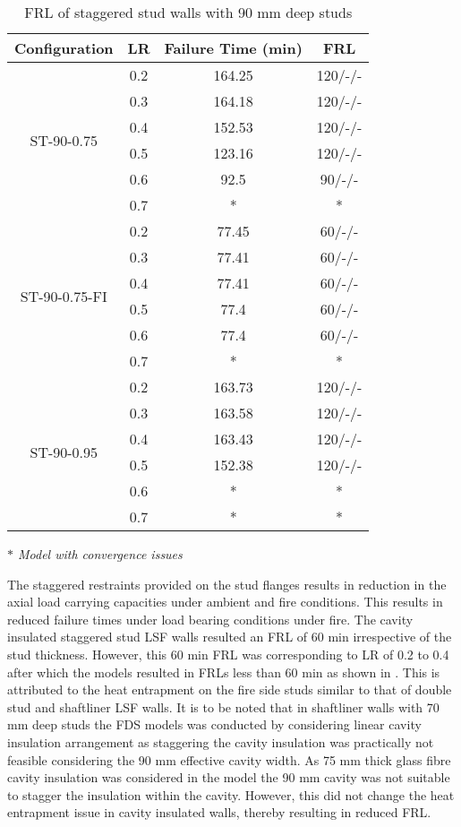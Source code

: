 \begin{table}[!htbp]
	\centering
	\caption{FRL of staggered stud walls with 90 mm deep studs}
	  \begin{tabular}{cccc}
	  \toprule
	  Configuration & LR    & Failure Time (min) & FRL \\
	  \midrule
	  \multirow{6}[2]{*}{ST-90-0.75} & 0.2   & 164.25 & 120/-/- \\
			& 0.3   & 164.18 & 120/-/- \\
			& 0.4   & 152.53 & 120/-/- \\
			& 0.5   & 123.16 & 120/-/- \\
			& 0.6   & 92.5  & 90/-/- \\
			& 0.7   & *     & * \\
	  \midrule
	  \multirow{6}[2]{*}{ST-90-0.75-FI} & 0.2   & 77.45 & 60/-/- \\
			& 0.3   & 77.41 & 60/-/- \\
			& 0.4   & 77.41 & 60/-/- \\
			& 0.5   & 77.4  & 60/-/- \\
			& 0.6   & 77.4  & 60/-/- \\
			& 0.7   & *     & * \\
	  \midrule
	  \multirow{6}[2]{*}{ST-90-0.95} & 0.2   & 163.73 & 120/-/- \\
			& 0.3   & 163.58 & 120/-/- \\
			& 0.4   & 163.43 & 120/-/- \\
			& 0.5   & 152.38 & 120/-/- \\
			& 0.6   & *     & * \\
			& 0.7   & *     & * \\
	  \bottomrule
	  \end{tabular}%
	\label{tab:frl-parametric-st-90}%

	\small \textit{$*$ Model with convergence issues}
\end{table}%

The staggered restraints provided on the stud flanges results in reduction in the axial load carrying capacities under ambient and fire conditions. This results in reduced failure times under load bearing conditions under fire. The cavity insulated staggered stud LSF walls resulted an FRL of 60 min irrespective of the stud thickness. However, this 60 min FRL was corresponding to LR of 0.2 to 0.4 after which the models resulted in FRLs less than 60 min as shown in . This is attributed to the heat entrapment on the fire side studs similar to that of double stud and shaftliner LSF walls. It is to be noted that in shaftliner walls with 70 mm deep studs the FDS models was conducted by considering linear cavity insulation arrangement as staggering the cavity insulation was practically not feasible considering the 90 mm effective cavity width. As 75 mm thick glass fibre cavity insulation was considered in the model the 90 mm cavity was not suitable to stagger the insulation within the cavity. However, this did not change the heat entrapment issue in cavity insulated walls, thereby resulting in reduced FRL. 


